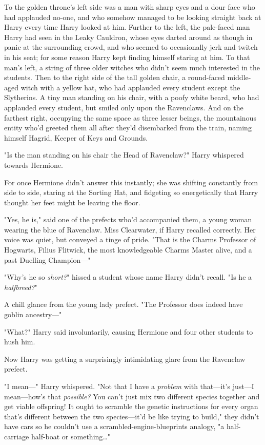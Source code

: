 To the golden throne's left side was a man with sharp eyes and a dour face who 
had applauded no-one, and who somehow managed to be looking straight back at 
Harry every time Harry looked at him. Further to the left, the pale-faced man 
Harry had seen in the Leaky Cauldron, whose eyes darted around as though in 
panic at the surrounding crowd, and who seemed to occasionally jerk and twitch 
in his seat; for some reason Harry kept finding himself staring at him. To that 
man's left, a string of three older witches who didn't seem much interested in 
the students. Then to the right side of the tall golden chair, a round-faced 
middle-aged witch with a yellow hat, who had applauded every student except the 
Slytherins. A tiny man standing on his chair, with a poofy white beard, who had 
applauded every student, but smiled only upon the Ravenclaws. And on the 
farthest right, occupying the same space as three lesser beings, the 
mountainous entity who'd greeted them all after they'd disembarked from the 
train, naming himself Hagrid, Keeper of Keys and Grounds.

"Is the man standing on his chair the Head of Ravenclaw?" Harry whispered 
towards Hermione.

For once Hermione didn't answer this instantly; she was shifting constantly 
from side to side, staring at the Sorting Hat, and fidgeting so energetically 
that Harry thought her feet might be leaving the floor.

"Yes, he is," said one of the prefects who'd accompanied them, a young woman 
wearing the blue of Ravenclaw. Miss Clearwater, if Harry recalled correctly. 
Her voice was quiet, but conveyed a tinge of pride. "That is the Charms 
Professor of Hogwarts, Filius Flitwick, the most knowledgeable Charms Master 
alive, and a past Duelling Champion---"

"Why's he so \emph{short?}" hissed a student whose name Harry didn't recall. 
"Is he a \emph{halfbreed?}"

A chill glance from the young lady prefect. "The Professor does indeed have 
goblin ancestry---"

"What?" Harry said involuntarily, causing Hermione and four other students to 
hush him.

Now Harry was getting a surprisingly intimidating glare from the Ravenclaw 
prefect.

"I mean---" Harry whispered. "Not that I have a \emph{problem} with that---it's 
just---I mean---how's that \emph{possible?} You can't just mix two different 
species together and get viable offspring! It ought to scramble the genetic 
instructions for every organ that's different between the two species---it'd be 
like trying to build," they didn't have cars so he couldn't use a 
scrambled-engine-blueprints analogy, "a half-carriage half-boat or 
something{\ldots}"

